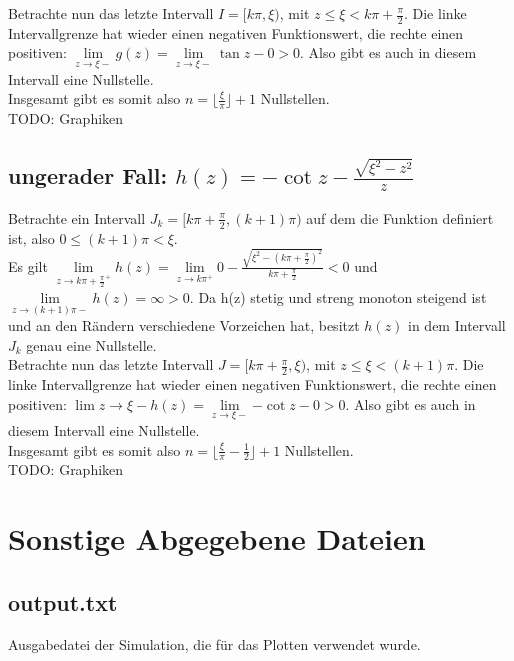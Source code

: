 \documentclass{scrartcl}
\begin{document}
Betrachte nun das letzte Intervall $I = [k\pi, \xi)$, mit $z \leq \xi < k\pi + \frac{\pi}{2}$. Die linke Intervallgrenze hat wieder einen negativen Funktionswert, die rechte einen positiven: $\lim\limits_{z\to \xi-}{g(z)} = \lim\limits_{z\to \xi-}{\tan{z} - 0} > 0$.  Also gibt es auch in diesem Intervall eine Nullstelle.\\

Insgesamt gibt es somit also $n = \lfloor\frac{\xi}{\pi}\rfloor + 1$ Nullstellen.\\

TODO: Graphiken

\subsection{ungerader Fall: $h(z) = -\cot z - \frac{\sqrt{\xi^2-z^2}}{z}$}

Betrachte ein Intervall $J_k = [k\pi+\frac{\pi}{2},(k+1)\pi)$ auf dem die Funktion definiert ist, also $0 \leq (k+1)\pi < \xi$.\\
Es gilt $\lim\limits_{z\to k\pi+\frac{\pi}{2}^+}{h(z)} = \lim\limits_{z\to k\pi^+}{0 - \frac{\sqrt{\xi^2-(k\pi+\frac{\pi}{2})^2}}{k\pi+\frac{\pi}{2}}} < 0$ und $\lim\limits_{z\to (k+1)\pi-}{h(z)} = \infty > 0$. Da h(z) stetig und streng monoton steigend ist und an den Rändern verschiedene Vorzeichen hat, besitzt $h(z)$ in dem Intervall $J_k$ genau eine Nullstelle.\\

Betrachte nun das letzte Intervall $J = [k\pi+\frac{\pi}{2}, \xi)$, mit $z \leq \xi < (k+1)\pi$. Die linke Intervallgrenze hat wieder einen negativen Funktionswert, die rechte einen positiven: $\lim{z\to \xi-}{h(z)} = \lim\limits_{z\to \xi-}{-\cot{z} - 0} > 0$.  Also gibt es auch in diesem Intervall eine Nullstelle.\\

Insgesamt gibt es somit also $n = \lfloor\frac{\xi}{\pi}-\frac{1}{2}\rfloor + 1$ Nullstellen.\\

TODO: Graphiken

\section{Sonstige Abgegebene Dateien}
\subsection{output.txt}
Ausgabedatei der Simulation, die für das Plotten verwendet wurde.
\end{document}

